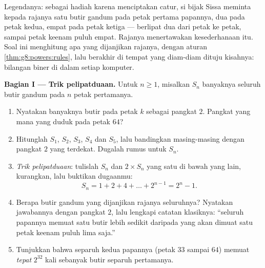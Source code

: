 \begin{problem}[{Soal akhir pekan --- \omterm{def:g1:addition:def}{jumlah} geometri
$1 + 2 + 4 + \dots + 2^{n-1} = 2^n - 1$, dari legenda yang terkenal
sampai bilangan biner}]
\label{pb:g8:powers:1}
Legendanya: sebagai hadiah karena menciptakan catur, si bijak Sissa
meminta kepada rajanya satu butir gandum pada petak pertama papannya,
dua pada petak kedua, empat pada petak ketiga --- berlipat dua dari
petak ke petak, sampai petak keenam puluh empat. Rajanya menertawakan
kesederhanaan itu. Soal ini menghitung apa yang dijanjikan rajanya,
dengan aturan  \cref{thm:g8:powers:rules}, lalu berakhir di
tempat yang diam-diam dituju kisahnya: bilangan biner di dalam setiap
komputer.

\medskip
\noindent\textbf{Bagian I --- Trik pelipatduaan.}
Untuk $n \geq 1$, misalkan $S_n$ banyaknya seluruh butir gandum pada
$n$ petak pertamanya.
\begin{enumerate}
  \item Nyatakan banyaknya butir pada petak $k$ sebagai pangkat
        $2$. Pangkat yang mana yang duduk pada petak $64$?
  \item Hitunglah $S_1$, $S_2$, $S_3$, $S_4$ dan $S_5$, lalu
        bandingkan masing-masing dengan pangkat $2$ yang terdekat.
        Dugalah rumus untuk $S_n$.
  \item \emph{Trik pelipatduaan}: tulislah  $S_n$ dan
        $2 \times S_n$ yang satu di bawah yang lain, kurangkan, lalu
        buktikan dugaanmu:
        \[
        S_n = 1 + 2 + 4 + \dots + 2^{n-1} = 2^n - 1 .
        \]
  \item Berapa butir gandum yang dijanjikan rajanya seluruhnya?
        Nyatakan jawabannya dengan pangkat $2$, lalu lengkapi
        catatan klasiknya: ``seluruh papannya memuat satu butir lebih
        sedikit daripada yang akan dimuat satu petak keenam puluh
        lima saja.''
  \item Tunjukkan bahwa separuh kedua papannya (petak $33$ sampai
        $64$) memuat \emph{tepat} $2^{32}$ kali sebanyak butir
        separuh pertamanya.
\end{enumerate}


\end{problem}
